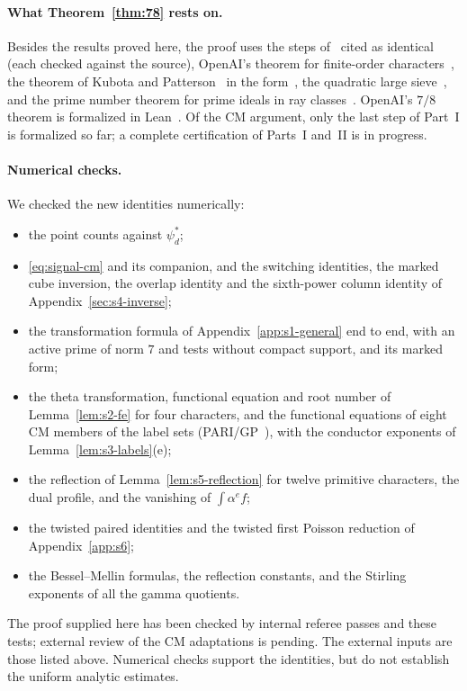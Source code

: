 \documentclass[11pt]{article}
\numberwithin{equation}{section}
\begin{document}
\paragraph{What Theorem~\ref{thm:78} rests on.} Besides the results proved here, the proof uses the steps
of~\cite{OAI78} cited as identical (each checked against the source), OpenAI's theorem for finite-order
characters~\cite[Theorem~1.1]{OAI78}, the theorem of Kubota and Patterson~\cite{Kub69,Pat77} in the form~\cite[Theorem~23]{QF}, the
quadratic large sieve~\cite{HB95,GL}, and the prime number theorem for prime ideals in ray classes~\cite{Hec17,Hec20}. OpenAI's
$7/8$ theorem is formalized in Lean~\cite{OAIlean}. Of the CM argument, only the last step of Part~I is
formalized so far; a complete certification of Parts~I and~II
is in progress.

\paragraph{Numerical checks.} We checked the new identities numerically:
\begin{itemize}
\item the point counts against $\psi_d^*$;
\item \eqref{eq:signal-cm} and its companion, and the switching identities, the marked cube inversion, the overlap
 identity and the sixth-power column identity of Appendix~\ref{sec:s4-inverse};
\item the transformation formula of Appendix~\ref{app:s1-general} end to end, with an active prime of norm $7$ and
 tests without compact support, and its marked form;
\item the theta transformation, functional equation and root number of Lemma~\ref{lem:s2-fe} for four characters,
 and the functional equations of eight CM members of the label sets (PARI/GP~\cite{PARI}), with the conductor exponents of
 Lemma~\ref{lem:s3-labels}(e);
\item the reflection of Lemma~\ref{lem:s5-reflection} for twelve primitive characters, the dual profile, and the
 vanishing of $\int\alpha^ef$;
\item the twisted paired identities and the twisted first Poisson reduction of Appendix~\ref{app:s6};
\item the Bessel--Mellin formulas, the reflection constants, and the Stirling exponents of all the gamma quotients.
\end{itemize}
The proof supplied here has been checked by internal referee passes and these tests;
external review of the CM adaptations is pending. The external inputs are those
listed above. Numerical checks support the identities, but do not establish the
uniform analytic estimates.
\end{document}

